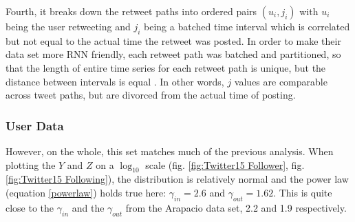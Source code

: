 \documentclass[preprint,review,12pt]{elsarticle}
\begin{document}
Fourth, it breaks down the retweet paths into ordered pairs $(u_i,j_i)$ with $u_i$ being the user retweeting and $j_i$ being a batched time interval which is correlated but not equal to the actual time the retweet was posted. In order to make their data set more RNN friendly, each retweet path was batched and partitioned, so that the length of entire time series for each retweet path is unique, but the distance between intervals is equal \citep{shu2017fake}. In other words, $j$ values are comparable across tweet paths, but are divorced from the actual time of posting.



 \subsubsection{User Data}
However, on the whole, this set matches much of the previous analysis. When plotting the $Y$ and $Z$ on a $\log_{10}$ scale (fig. \ref{fig:Twitter15 Follower}, fig. \ref{fig:Twitter15 Following}), the distribution is relatively normal and the power law (equation \ref{powerlaw}) holds true here:  $\gamma_{in} = 2.6$ and $\gamma_{out} = 1.62$. This is quite close to the $\gamma_{in}$ and the $\gamma_{out}$  from the Arapacio data set, 2.2 and 1.9 respectively.
 
\end{document}
